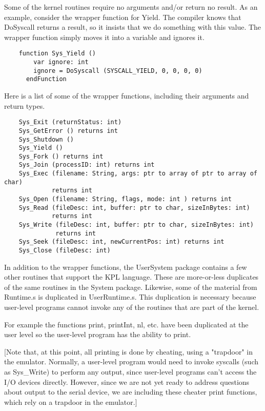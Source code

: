 \documentclass[12pt]{article}
\begin{document}
Some of the kernel routines require no arguments and/or return no
result.  As an example, consider the wrapper function for Yield.  The
compiler knows that DoSyscall returns a result, so it insists that we
do something with this value.  The wrapper function simply moves it
into a variable and ignores it.

\begin{verbatim}
    function Sys_Yield ()
        var ignore: int
        ignore = DoSyscall (SYSCALL_YIELD, 0, 0, 0, 0)
      endFunction
\end{verbatim}

Here is a list of some of the wrapper functions, including their arguments
and return types.

\begin{verbatim}
    Sys_Exit (returnStatus: int)
    Sys_GetError () returns int
    Sys_Shutdown ()
    Sys_Yield ()
    Sys_Fork () returns int
    Sys_Join (processID: int) returns int
    Sys_Exec (filename: String, args: ptr to array of ptr to array of char)
             returns int
    Sys_Open (filename: String, flags, mode: int ) returns int
    Sys_Read (fileDesc: int, buffer: ptr to char, sizeInBytes: int)
             returns int
    Sys_Write (fileDesc: int, buffer: ptr to char, sizeInBytes: int)
              returns int
    Sys_Seek (fileDesc: int, newCurrentPos: int) returns int
    Sys_Close (fileDesc: int)
\end{verbatim}

In addition to the wrapper functions, the UserSystem package contains
a few other routines that support the KPL language.  These are
more-or-less duplicates of the same routines in the System package.
Likewise, some of the material from Runtime.s is duplicated in
UserRuntime.s.  This duplication is necessary because user-level
programs cannot invoke any of the routines that are part of the
kernel.

For example the functions print, printInt, nl, etc. have been
duplicated at the user level so the user-level program has the ability
to print.

[Note that, at this point, all printing is done by cheating, using a
"trapdoor" in the emulator.  Normally, a user-level program would need
to invoke syscalls (such as Sys\_Write) to perform any output, since
user-level programs can't access the I/O devices directly.  However,
since we are not yet ready to address questions about output to the
serial device, we are including these cheater print functions, which
rely on a trapdoor in the emulator.]
\end{document}
